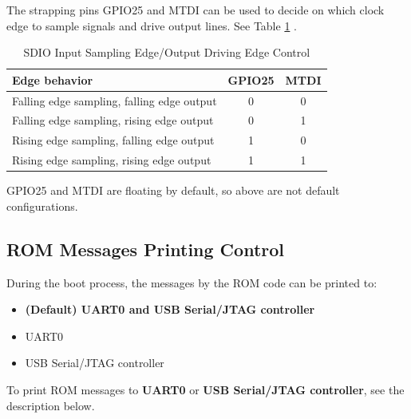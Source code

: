 \documentclass[main\_\_EN.tex]{subfiles}
\begin{document}
The strapping pins GPIO25 and MTDI can be used to decide on which clock edge to sample signals and drive output lines. See Table \ref{tab:bootctrl-sdio-strapping} \textit{}.

\begin{table}[H]
    \centering
    \caption{SDIO Input Sampling Edge/Output Driving Edge Control}
   \label{tab:bootctrl-sdio-strapping}

    \begin{threeparttable}
    \begin{tabular}{ | l | c | c| }
    \hline
        \rowcolor{lightgray}
        \textbf{Edge behavior} & \textbf{GPIO25} & \textbf{MTDI} \\\hline

        Falling edge sampling, falling edge output & 0 & 0 \\\hline
        Falling edge sampling, rising edge output & 0 & 1 \\\hline
        Rising edge sampling, falling edge output & 1 & 0 \\\hline
        Rising edge sampling, rising edge output & 1 & 1 \\\hline
        \end{tabular}

        \begin{tablenotes}
            \item[1] GPIO25 and MTDI are floating by default, so above are not default configurations.
        \end{tablenotes}

     \end{threeparttable}
\end{table}

\subsection{ROM Messages Printing Control}

During the boot process, the messages by the ROM code can be printed to:

\begin{itemize}
    \item \textbf{(Default) UART0 and USB Serial/JTAG controller}
    \item UART0
    \item USB Serial/JTAG controller
    \end{itemize}

To print ROM messages to \textbf{UART0} or \textbf{USB Serial/JTAG controller}, see the description below.
\end{document}
